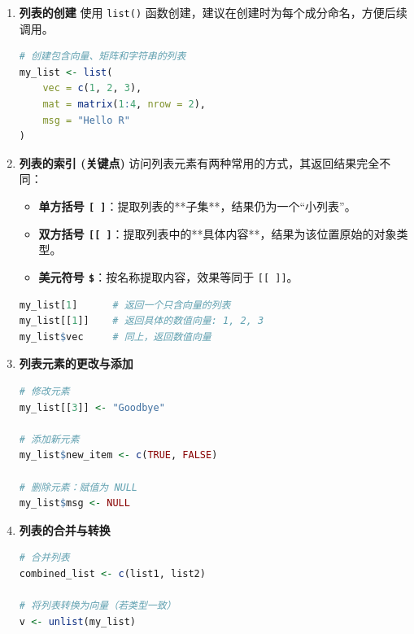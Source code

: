 \begin{enumerate}[label=\arabic*., leftmargin=2em]
    \item \textbf{列表的创建}
    使用 \texttt{list()} 函数创建，建议在创建时为每个成分命名，方便后续调用。
\begin{lstlisting}[language=R]
# 创建包含向量、矩阵和字符串的列表
my_list <- list(
    vec = c(1, 2, 3), 
    mat = matrix(1:4, nrow = 2), 
    msg = "Hello R"
)
\end{lstlisting}

    \item \textbf{列表的索引 (关键点)}
    访问列表元素有两种常用的方式，其返回结果完全不同：
    \begin{itemize}
        \item \textbf{单方括号 \texttt{[ ]}}：提取列表的**子集**，结果仍为一个“小列表”。
        \item \textbf{双方括号 \texttt{[[ ]}}：提取列表中的**具体内容**，结果为该位置原始的对象类型。
        \item \textbf{美元符号 \texttt{\$}}：按名称提取内容，效果等同于 \texttt{[[ ]]}。
    \end{itemize}
\begin{lstlisting}[language=R]
my_list[1]      # 返回一个只含向量的列表
my_list[[1]]    # 返回具体的数值向量: 1, 2, 3
my_list$vec     # 同上，返回数值向量
\end{lstlisting}

    \item \textbf{列表元素的更改与添加}
\begin{lstlisting}[language=R]
# 修改元素
my_list[[3]] <- "Goodbye" 

# 添加新元素
my_list$new_item <- c(TRUE, FALSE)

# 删除元素：赋值为 NULL
my_list$msg <- NULL
\end{lstlisting}

    \item \textbf{列表的合并与转换}
\begin{lstlisting}[language=R]
# 合并列表
combined_list <- c(list1, list2)

# 将列表转换为向量（若类型一致）
v <- unlist(my_list) 
\end{lstlisting}
\end{enumerate}



